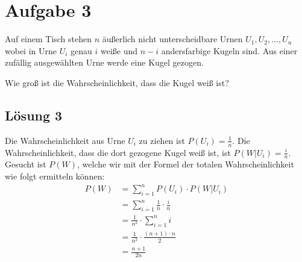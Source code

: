 \documentclass[main.tex]{subfiles}
\begin{document}
\section{Aufgabe 3}
Auf einem Tisch stehen $n$ äußerlich nicht unterscheidbare Urnen $U_1, U_2, \ldots, U_n$ wobei in Urne $U_i$ genau $i$ weiße und $n - i$ andersfarbige Kugeln sind. Aus einer zufällig ausgewählten Urne werde eine Kugel gezogen.

Wie groß ist die Wahrscheinlichkeit, dass die Kugel weiß ist?

\subsection{Lösung 3}
Die Wahrscheinlichkeit aus Urne $U_i$ zu ziehen ist $P(U_i) = \frac{1}{n}$. Die Wahrscheinlichkeit, dass die dort gezogene Kugel weiß ist, ist $P(W|U_i) = \frac{i}{n}$. Gesucht ist $P(W)$, welche wir mit der Formel der totalen Wahrscheinlichkeit wie folgt ermitteln können:
$$\begin{aligned}
    P(W) &= \sum^{n}_{i=1} P(U_i)\cdot P(W|U_i) \\[2mm]
    &= \sum^{n}_{i=1} \frac{1}{n} \cdot \frac{i}{n} \\[2mm]
    &= \frac{1}{n^2} \cdot \sum^{n}_{i=1} i \\[2mm]
    &= \frac{1}{n^2} \cdot \frac{(n+1)\cdot n}{2} \\[2mm]
    &= \frac{n+1}{2n} \\
\end{aligned}$$
\end{document}
